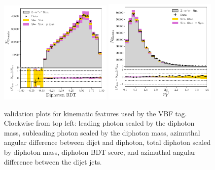 \begin{figure}[h!]
\begin{center}
    \end{center}
    \begin{center}
        \includegraphics[width=0.49\textwidth]{figures/appendix_zee/dipho_bdt_zee_LPS.pdf}
        \includegraphics[width=0.49\textwidth]{figures/appendix_zee/total_ptom_zee_LPS.pdf}
    \end{center}
    \caption{\Zee validation plots for kinematic features used by the VBF tag. Clockwise from top left: leading photon \pt scaled by the diphoton mass, 
             subleading photon \pt scaled by the diphoton mass, azimuthal angular difference between dijet and diphoton, total diphoton \pt scaled by diphoton mass,
             diphoton BDT score, and azimuthal angular difference between the dijet jets.}
\end{figure}


